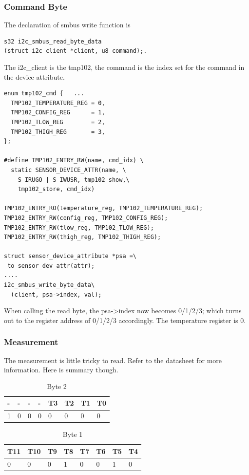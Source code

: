 \documentclass{article}
\begin{document}
\subsubsection{Command Byte}
The declaration of smbus write function is
\begin{verbatim}
s32 i2c_smbus_read_byte_data
(struct i2c_client *client, u8 command);. 
\end{verbatim}
The i2c\_client is the tmp102, the command is the index set for the command in the device attribute. 
\begin{verbatim}
enum tmp102_cmd { 	...
  TMP102_TEMPERATURE_REG = 0, 	
  TMP102_CONFIG_REG      = 1,
  TMP102_TLOW_REG        = 2,
  TMP102_THIGH_REG       = 3, 
};

#define TMP102_ENTRY_RW(name, cmd_idx) \ 	
  static SENSOR_DEVICE_ATTR(name, \
    S_IRUGO | S_IWUSR, tmp102_show,\
    tmp102_store, cmd_idx) 

TMP102_ENTRY_RO(temperature_reg, TMP102_TEMPERATURE_REG);
TMP102_ENTRY_RW(config_reg, TMP102_CONFIG_REG);
TMP102_ENTRY_RW(tlow_reg, TMP102_TLOW_REG);
TMP102_ENTRY_RW(thigh_reg, TMP102_THIGH_REG);

struct sensor_device_attribute *psa =\
 to_sensor_dev_attr(attr);
....
i2c_smbus_write_byte_data\
  (client, psa->index, val);
\end{verbatim}
When calling the read byte, the psa->index now becomes 0/1/2/3; which turns out to the register address of 0/1/2/3 accordingly. The temperature register is 0. 

\subsubsection{Measurement}
The measurement is little tricky to read. Refer to the datasheet for more information. Here is summary though. 

\begin{table}[H]
\centering
 \begin{tabular}{|l|l|l|l|l|l|l|l|}
 \hline - & - & - & - & T3 & T2 & T1 & T0 \\ 
 \hline 1 & 0 & 0 & 0 & 0 & 0 & 0 & 0 \\
 \hline 
 \end{tabular} 
\caption{Byte 2}
\end{table}

\begin{table}[H]
\centering
 \begin{tabular}{|l|l|l|l|l|l|l|l|}
 \hline T11 & T10 & T9 & T8 & T7 & T6 & T5 & T4 \\ 
 \hline 0 & 0 & 0 & 1 & 0 & 0 & 1 & 0 \\
 \hline 
 \end{tabular} 
\caption{Byte 1}
\end{table}
\end{document}
